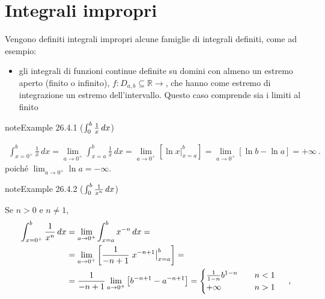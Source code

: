 \documentclass[letterpaper,10pt,italian]{jupyterBook}
\begin{document}
\section{Integrali impropri}
\label{\detokenize{ch/infinitesimal_calculus/integrals:integrali-impropri}}\label{\detokenize{ch/infinitesimal_calculus/integrals:infinitesimal-calculus-integrals-improper}}
\sphinxAtStartPar
Vengono definiti integrali impropri alcune famiglie di integrali definiti, come ad esempio:
\begin{itemize}
\item {} 
\sphinxAtStartPar
gli integrali di funzioni continue definite su domini con almeno un estremo aperto (finito o infinito), \(f: D_{a,b} \subseteq \mathbb{R} \rightarrow\), che hanno come estremo di integrazione un estremo dell’intervallo. Questo caso comprende sia i limiti al finito

\end{itemize}
\label{ch/infinitesimal_calculus/integrals:integrals-fundamental-1x}
\begin{sphinxadmonition}{note}{Example 26.4.1 (\protect\(\int_{0}^{b} \frac{1}{x} \, dx\protect\))}


\begin{equation*}
\begin{split}
\int_{x=0^+}^{b} \frac{1}{x} \, dx = \lim_{a \rightarrow 0^+} \int_{x=a}^{b} \frac{1}{x} \, dx = \lim_{a \rightarrow 0^+} \left[ \left.\ln x \right|_{x=a}^{b} \right] = \lim_{a \rightarrow 0^+} \left[ \ln {b} - \ln a \right] = + \infty \ .
\end{split}
\end{equation*}
\sphinxAtStartPar
poiché \(\lim_{a \rightarrow 0^+} \ln a = -\infty\).
\end{sphinxadmonition}
\label{ch/infinitesimal_calculus/integrals:integrals-fundamental-1xn}
\begin{sphinxadmonition}{note}{Example 26.4.2 (\protect\(\int_{0}^{b} \frac{1}{x^n} \, dx\protect\))}



\sphinxAtStartPar
Se \(n>0\) e \(n \ne 1\),
\begin{equation*}
\begin{split}\begin{aligned}
\int_{x=0^+}^{b} \frac{1}{x^n} \, dx
 & = \lim_{a \rightarrow 0^+} \int_{x=a}^{b} x^{-n} \, dx = \\
 & = \lim_{a \rightarrow 0^+} \left[ \frac{1}{-n+1} \left. x^{-n+1} \right|_{x=a}^{b} \right] = \\
 & = \frac{1}{-n+1} \lim_{a \rightarrow 0^+} \left[ b^{-n+1} - a^{-n+1} \right] 
   = \begin{cases} \frac{1}{1-n} b^{1-n} \hfill \qquad \text{$n < 1$} \\ +\infty \hfill \qquad \text{$n > 1$} \end{cases} \ ,
\end{aligned}\end{split}
\end{equation*}\end{sphinxadmonition}
\end{document}
